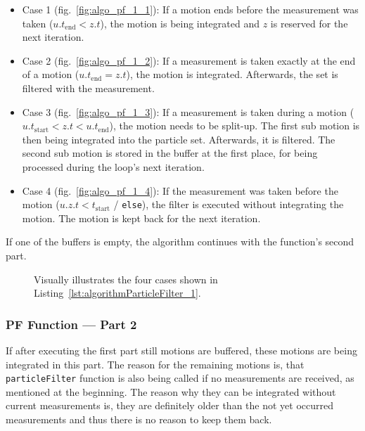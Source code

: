 \begin{itemize}
\item{Case 1} (fig.\ \ref{fig:algo_pf_1_1}): If a motion ends before the measurement was taken ($u.{t_\text{end}} < z.t$), the motion is being integrated and $z$ is reserved for the next iteration.

\item{Case 2} (fig.\ \ref{fig:algo_pf_1_2}): If a measurement is taken exactly at the end of a motion ($u.{t_\text{end}} = z.t$), the motion is integrated. Afterwards, the set is filtered with the measurement.

\item{Case 3} (fig.\ \ref{fig:algo_pf_1_3}): If a measurement is taken during a motion ($u.{t_\text{start}} < z.t < u.{t_\text{end}}$), the motion needs to be split-up. The first sub motion is then being integrated into the particle set. Afterwards, it is filtered. The second sub motion is stored in the buffer at the first place, for being processed during the loop's next iteration.

\item{Case 4} (fig.\ \ref{fig:algo_pf_1_4}): If the measurement was taken before the motion ($u.{z.t < t_\text{start}}$ / \texttt{else}), the filter is executed without integrating the motion. The motion is kept back for the next iteration.

\end{itemize}

\noindent If one of the buffers is empty, the algorithm continues with the function's second part.



\begin{figure}
	
	\caption{Visually illustrates the four cases shown in Listing~\ref{lst:algorithmParticleFilter_1}.}
	\label{fig:algo_pf_1}
\end{figure}


\subsubsection*{\acl{PF} Function --- Part 2}
If after executing the first part still motions are buffered, these motions are being integrated in this part. The reason for the remaining motions is, that \texttt{particleFilter} function is also being called if no measurements are received, as mentioned at the beginning. The reason why they can be integrated without current measurements is, they are definitely older than the not yet occurred measurements and thus there is no reason to keep them back.

